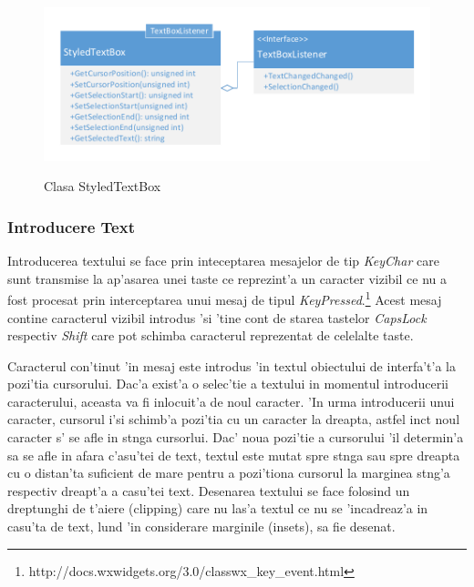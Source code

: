 \begin{center}
\begin{figure}[h]
    \centering
    \includegraphics{img/uml_class_textbox.pdf}
    \label{fig0510}
    \caption{Clasa StyledTextBox}
\end{figure}
\end{center}

\subsubsection{Introducere Text}

Introducerea textului se face prin inteceptarea mesajelor de tip \emph{KeyChar} care sunt transmise la ap'asarea unei taste ce reprezint'a un caracter vizibil ce nu a fost procesat prin interceptarea unui mesaj de tipul \emph{KeyPressed}.\footnote{http://docs.wxwidgets.org/3.0/classwx\_key\_event.html} Acest mesaj contine caracterul vizibil introdus 'si 'tine cont de starea tastelor \emph{CapsLock} respectiv \emph{Shift} care pot schimba caracterul reprezentat de celelalte taste.

\medskip

Caracterul con'tinut 'in mesaj este introdus 'in textul obiectului de interfa't'a la pozi'tia cursorului. Dac'a exist'a o selec'tie a textului in momentul introducerii caracterului, aceasta va fi inlocuit'a de noul caracter. 'In urma introducerii unui caracter, cursorul i'si schimb'a pozi'tia cu un caracter la dreapta, astfel inc{\ia}t noul caracter s' se afle in st{\ia}nga cursorlui. Dac' noua pozi'tie a cursorului 'il determin'a sa se afle in afara c'asu'tei de text, textul este mutat spre st{\ia}nga sau spre dreapta cu o distan'ta suficient de mare pentru a pozi'tiona cursorul la marginea st{\ia}ng'a respectiv dreapt'a a casu'tei text. Desenarea textului se face folosind un dreptunghi de t'aiere (clipping) care nu las'a textul ce nu se 'incadreaz'a in casu'ta de text, lu{\ia}nd 'in considerare marginile (insets), sa fie desenat.

